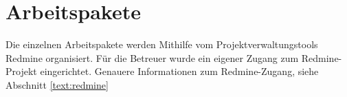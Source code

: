\chapter{Arbeitspakete}
Die einzelnen Arbeitspakete werden Mithilfe vom Projektverwaltungstools Redmine organisiert. Für die Betreuer wurde ein eigener Zugang zum Redmine-Projekt eingerichtet.
Genauere Informationen zum Redmine-Zugang, siehe Abschnitt \ref{text:redmine}